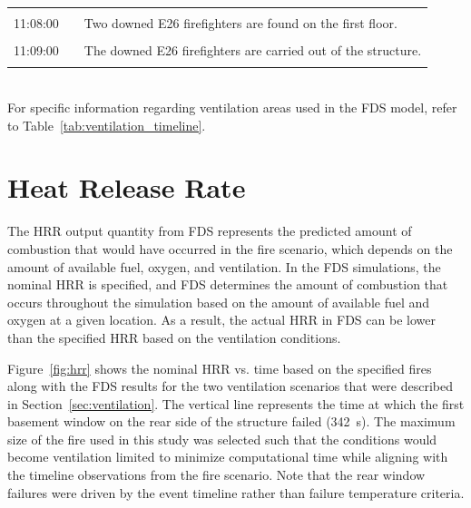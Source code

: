 \documentclass[12pt,oneside]{book}
\begin{document}
\begin{table}[!ht]
\begin{tabular}{ccl}
               &              &                                                                   \\
11:08:00       &              &  Two downed E26 firefighters are found on the first floor.        \\
               &              &                                                                   \\
11:09:00       &              &  The downed E26 firefighters are carried out of the structure.    \\
               &              &                                                                   \\
\bottomrule
\end{tabular}
\footnotesize
\\ For specific information regarding ventilation areas used in the FDS model, refer to Table~\ref{tab:ventilation_timeline}.
\normalsize
\label{tab:combined_timeline}
\end{table}


\clearpage


\section{Heat Release Rate}
\label{sec:HRR}

The HRR output quantity from FDS represents the predicted amount of combustion that would have occurred in the fire scenario, which depends on the amount of available fuel, oxygen, and ventilation. In the FDS simulations, the nominal HRR is specified, and FDS determines the amount of combustion that occurs throughout the simulation based on the amount of available fuel and oxygen at a given location. As a result, the actual HRR in FDS can be lower than the specified HRR based on the ventilation conditions.

Figure~\ref{fig:hrr} shows the nominal HRR vs. time based on the specified fires along with the FDS results for the two ventilation scenarios that were described in Section~\ref{sec:ventilation}. The vertical line represents the time at which the first basement window on the rear side of the structure failed (342~s). The maximum size of the fire used in this study was selected such that the conditions would become ventilation limited to minimize computational time while aligning with the timeline observations from the fire scenario. Note that the rear window failures were driven by the event timeline rather than failure temperature criteria.
\end{document}
